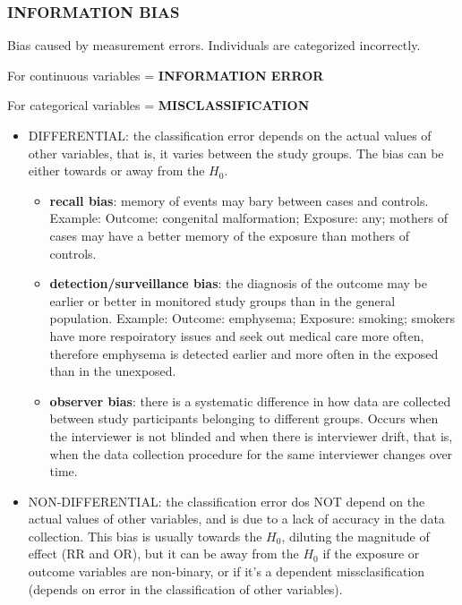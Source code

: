 \documentclass[
]{article}
\begin{document}
\hypertarget{information-bias}{%
\subsubsection{INFORMATION BIAS}\label{information-bias}}

Bias caused by measurement errors. Individuals are categorized
incorrectly.

For continuous variables = \textbf{INFORMATION ERROR}

For categorical variables = \textbf{MISCLASSIFICATION}

\begin{itemize}
\item
  DIFFERENTIAL: the classification error depends on the actual values of
  other variables, that is, it varies between the study groups. The bias
  can be either towards or away from the \(H_0\).

  \begin{itemize}
  \item
    \textbf{recall bias}: memory of events may bary between cases and
    controls. Example: Outcome: congenital malformation; Exposure: any;
    mothers of cases may have a better memory of the exposure than
    mothers of controls.
  \item
    \textbf{detection/surveillance bias}: the diagnosis of the outcome
    may be earlier or better in monitored study groups than in the
    general population. Example: Outcome: emphysema; Exposure: smoking;
    smokers have more respoiratory issues and seek out medical care more
    often, therefore emphysema is detected earlier and more often in the
    exposed than in the unexposed.
  \item
    \textbf{observer bias}: there is a systematic difference in how data
    are collected between study participants belonging to different
    groups. Occurs when the interviewer is not blinded and when there is
    interviewer drift, that is, when the data collection procedure for
    the same interviewer changes over time.
  \end{itemize}
\item
  NON-DIFFERENTIAL: the classification error dos NOT depend on the
  actual values of other variables, and is due to a lack of accuracy in
  the data collection. This bias is usually towards the \(H_0\),
  diluting the magnitude of effect (RR and OR), but it can be away from
  the \(H_0\) if the exposure or outcome variables are non-binary, or if
  it's a dependent missclasification (depends on error in the
  classification of other variables).


\end{itemize}
\end{document}
